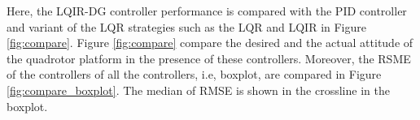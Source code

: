 \documentclass[3p,times]{elsarticle}
\begin{document}





\noindent Here, the LQIR-DG controller performance is compared with the PID controller and variant of the LQR strategies such as the LQR and LQIR in Figure \ref{fig:compare}. 
Figure \ref{fig:compare} compare the desired and the actual attitude of the quadrotor platform in the presence of these controllers.
Moreover, the RSME of the controllers of all the controllers, i.e, boxplot, are compared in Figure \ref{fig:compare_boxplot}. 
The median of RMSE is shown in the crossline in the boxplot.
\end{document}
